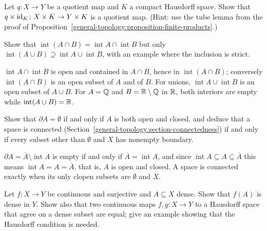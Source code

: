 \begin{exercise}\label{general-topology:exercise-quotient-product}
Let $q \colon X \to Y$ be a quotient map and $K$ a compact Hausdorff space. Show that $q \times \mathrm{id}_K \colon X \times K \to Y \times K$ is a quotient map. (Hint:
use the tube lemma from the proof of Proposition~\ref{general-topology:proposition-finite-products}.)
\end{exercise}

\begin{exercise}\label{general-topology:exercise-interior-union}
Show that $\operatorname{int}(A \cap B) = \operatorname{int}A \cap \operatorname{int}B$ but only $\operatorname{int}(A \cup B) \supseteq \operatorname{int}A \cup \operatorname{int}B$, with an example where the
inclusion is strict.
\end{exercise}

\begin{solution}
$\operatorname{int}A \cap \operatorname{int}B$ is open and contained in $A \cap B$, hence in $\operatorname{int}(A \cap B)$; conversely $\operatorname{int}(A \cap B)$ is an open subset of $A$ and of $B$. For
unions, $\operatorname{int}A \cup \operatorname{int}B$ is an open subset of $A \cup B$. For $A = \mathbb{Q}$ and $B = \mathbb{R} \setminus \mathbb{Q}$ in $\mathbb{R}$, both interiors are empty while $\operatorname{int}(A \cup B) = \mathbb{R}$.
\end{solution}

\begin{exercise}\label{general-topology:exercise-boundary-clopen}
Show that $\partial A = \emptyset$ if and only if $A$ is both open and closed, and deduce that a space is connected (Section~\ref{general-topology:section-connectedness}) if and only if every subset other
than $\emptyset$ and $X$ has nonempty boundary.
\end{exercise}

\begin{solution}
$\partial A = \overline{A} \setminus \operatorname{int}A$ is empty if and only if $\overline{A} = \operatorname{int}A$, and since $\operatorname{int}A \subseteq A \subseteq \overline{A}$ this means
$\operatorname{int}A = A = \overline{A}$, that is, $A$ is open and closed. A space is connected exactly when its only clopen subsets are $\emptyset$ and $X$.
\end{solution}

\begin{exercise}\label{general-topology:exercise-dense-image}
Let $f \colon X \to Y$ be continuous and surjective and $A \subseteq X$ dense. Show that $f(A)$ is dense in $Y$. Show also that two continuous maps $f, g \colon X \to Y$ to a Hausdorff space that agree on a
dense subset are equal; give an example showing that the Hausdorff condition is needed.
\end{exercise}


